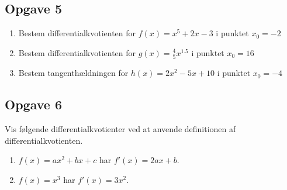\subsection*{Opgave 5}
\begin{enumerate}[label=\roman*)]
	\item Bestem differentialkvotienten for $f(x) = x^5+2x -3$ i punktet $x_0 = -2$
	\item Bestem differentialkvotienten for $g(x) = \frac{4}{5}x^{1.5}$ i punktet $x_0 =16$
	\item Bestem tangenthældningen for $h(x) = 2x^{2}-5x+10$ i punktet $x_0 = -4$
\end{enumerate}

\subsection*{Opgave 6}
Vis følgende differentialkvotienter ved at anvende definitionen af differentialkvotienten.
\begin{enumerate}[label=\roman*)]
	\item $f(x) = ax^2 + bx + c$ har $f'(x) = 2ax + b$.
	\item $f(x) = x^3$ har $f'(x) = 3x^2$.
\end{enumerate}